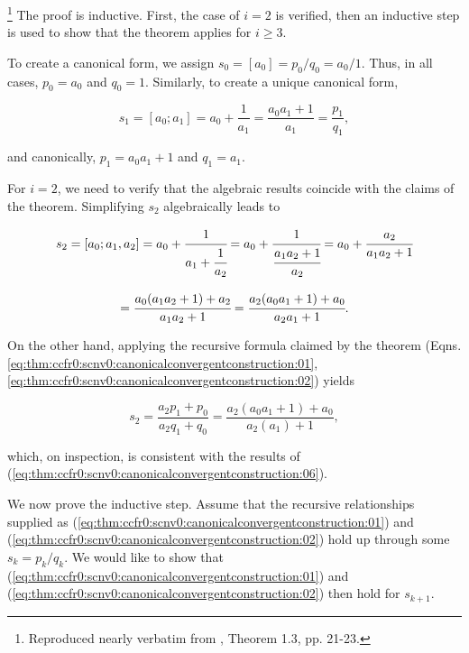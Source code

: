 \begin{vworktheoremproof}\hspace{-0.4em}\footnote{Reproduced nearly
verbatim from \cite{bibref:b:OldsClassic}, Theorem 1.3, pp. 21-23.}
The proof is inductive.  First, the case of $i=2$ is verified,
then an inductive step is used to show that the theorem applies
for $i \geq 3$.

To create a canonical form, we assign 
$s_0 = [a_0] = p_0/q_0 = a_0/1$.  Thus, in all cases, $p_0 = a_0$
and $q_0 = 1$.  Similarly, to create a unique canonical form,

\begin{equation}
\label{eq:thm:ccfr0:scnv0:canonicalconvergentconstruction:05}
s_1 = [a_0;a_1] = a_0 + \frac{1}{a_1} = \frac{a_0 a_1 + 1}{a_1} = \frac{p_1}{q_1} ,
\end{equation}

\noindent{}and canonically, $p_1 = a_0 a_1 + 1$ and $q_1 = a_1$.

For $i=2$, we need to verify that the algebraic results coincide with the
claims of the theorem.  Simplifying $s_2$ algebraically leads to

\begin{equation}
\label{eq:thm:ccfr0:scnv0:canonicalconvergentconstruction:06}
\begin{array}{c}
s_2 = [a_0;a_1,a_2] = 
a_0 + \cfrac{1}{a_1 + \cfrac{1}{a_2}} = 
a_0 + \cfrac{1}{\cfrac{a_1 a_2 + 1}{a_2}} = a_0 + \cfrac{a_2}{a_1 a_2 + 1}  \\
\\
=\cfrac{a_0 (a_1 a_2 + 1) + a_2}{a_1 a_2 + 1}
=\cfrac{a_2(a_0 a_1 + 1) + a_0}{a_2 a_1 + 1} .
\end{array}
\end{equation}

\noindent{}On the other hand, applying the recursive formula
claimed by the theorem (Eqns. 
\ref{eq:thm:ccfr0:scnv0:canonicalconvergentconstruction:01},
\ref{eq:thm:ccfr0:scnv0:canonicalconvergentconstruction:02}) yields

\begin{equation}
\label{eq:thm:ccfr0:scnv0:canonicalconvergentconstruction:07}
s_2 = \frac{a_2 p_1 + p_0}{a_2 q_1 + q_0} 
= \frac{a_2(a_0 a_1 + 1) + a_0}{a_2 (a_1) + 1} ,
\end{equation}

which, on inspection, is consistent with the results of 
(\ref{eq:thm:ccfr0:scnv0:canonicalconvergentconstruction:06}).

We now prove the inductive step.  Assume that
the recursive relationships supplied as
(\ref{eq:thm:ccfr0:scnv0:canonicalconvergentconstruction:01})
and (\ref{eq:thm:ccfr0:scnv0:canonicalconvergentconstruction:02}) 
hold up through some $s_k = p_k/q_k$.  We would like to show that
(\ref{eq:thm:ccfr0:scnv0:canonicalconvergentconstruction:01})
and (\ref{eq:thm:ccfr0:scnv0:canonicalconvergentconstruction:02}) 
then hold for $s_{k+1}$.


\end{vworktheoremproof}
